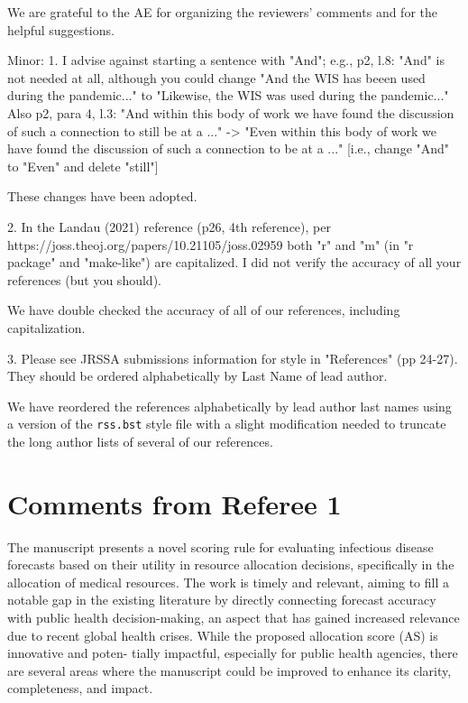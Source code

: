 \documentclass{article}
\begin{document}
We are grateful to the AE for organizing the reviewers’ comments and for the helpful suggestions. 

\begin{quotebar}
Minor:
1. I advise against starting a sentence with "And"; e.g., p2, l.8:
"And" is not needed at all, although you could change
  "And the WIS has beeen used during the pandemic..."
to
  "Likewise, the WIS was used during the pandemic..."
Also p2, para 4, l.3:
 "And within this body of work we have found the discussion of such
  a connection to still be at a ..."
->
 "Even within this body of work we have found the discussion of such
  a connection to be at a ..."
  [i.e., change "And" to "Even" and delete "still"]
\end{quotebar}

These changes have been adopted.

\begin{quotebar}
2. In the Landau (2021) reference (p26, 4th reference), per \\
https://joss.theoj.org/papers/10.21105/joss.02959
both "r" and "m" (in "r package" and "make-like") are capitalized.
I did not verify the accuracy of all your references (but you should).
\end{quotebar}

We have double checked the accuracy of all of our references, including capitalization.

\begin{quotebar}
3. Please see JRSSA submissions information for style in "References" (pp 24-27). They
should be ordered alphabetically by Last Name of lead author.
\end{quotebar}

We have reordered the references alphabetically by lead author last names
using a version of the \texttt{rss.bst} style file with a slight modification needed to
truncate the long author lists of several of our references.


\section*{Comments from Referee 1}

\begin{quotebar}
The manuscript presents a novel scoring rule for evaluating infectious disease forecasts based on their utility in resource allocation decisions, specifically in the allocation of medical resources. The work is timely and relevant, aiming to fill a notable gap in the existing literature by directly connecting forecast accuracy with public health decision-making, an aspect that has gained increased relevance due to recent global health crises. While the proposed allocation score (AS) is innovative and poten- tially impactful, especially for public health agencies, there are several areas where the manuscript could be improved to enhance its clarity, completeness, and impact.
\end{quotebar}
\end{document}
